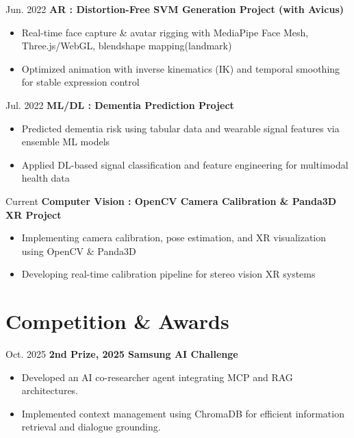 \documentclass[10pt, letterpaper]{article}
\newenvironment{highlights}{
    \begin{itemize}[
        topsep=0.10 cm,
        parsep=0.10 cm,
        partopsep=0pt,
        itemsep=0pt,
        leftmargin=0.4 cm + 10pt
    ]
}{
    \end{itemize}
} %
\newenvironment{twocolentry_project}[2][]{
    \onecolentry
    \def\secondColumn{#2}
    \setcolumnwidth{\fill, 2.0 cm}
    \begin{paracol}{2}
}{
    \switchcolumn \raggedleft \secondColumn
    \end{paracol}
    \endonecolentry
} %
\begin{document}
    \vspace{0.2 cm}
    \begin{twocolentry_project}{Jun. 2022}
        \textbf{AR : Distortion-Free SVM Generation Project (with Avicus)}
        \begin{highlights}
            \item Real-time face capture \& avatar rigging with MediaPipe Face Mesh, Three.js/WebGL, blendshape mapping(landmark)
            \item Optimized animation with inverse kinematics (IK) and temporal smoothing for stable expression control
        \end{highlights}
    \end{twocolentry_project}
        
    \vspace{0.2 cm}
    \begin{twocolentry_project}{Jul. 2022}
        \textbf{ML/DL : Dementia Prediction Project}
        \begin{highlights}
            \item Predicted dementia risk using tabular data and wearable signal features via ensemble ML models
            \item Applied DL-based signal classification and feature engineering for multimodal health data
        \end{highlights}
    \end{twocolentry_project}

    \vspace{0.2 cm}
    \begin{twocolentry_project}{Current}
        \textbf{Computer Vision : OpenCV Camera Calibration \& Panda3D XR Project}
        \begin{highlights}
            \item Implementing camera calibration, pose estimation, and XR visualization using OpenCV \& Panda3D
            \item Developing real-time calibration pipeline for stereo vision XR systems
        \end{highlights}
    \end{twocolentry_project}

    \vspace{0.2 cm}
    \section{Competition \& Awards}

    \begin{twocolentry_project}{
        Oct. 2025
    }
        \textbf{2nd Prize, 2025 Samsung AI Challenge}
        \begin{highlights}
            \item Developed an AI co-researcher agent integrating MCP and RAG architectures.
            \item Implemented context management using ChromaDB for efficient information retrieval and dialogue grounding.
        \end{highlights}
    \end{twocolentry_project}
\end{document}
